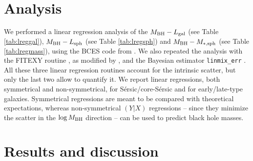 \documentclass[preprint2]{emulateapj}
\begin{document}



\section{Analysis}
\label{sec:anal}
We performed a linear regression analysis of the $M_{\rm BH} - L_{\rm gal}$ (see Table \ref{tab:lreggal}), 
$M_{\rm BH} - L_{\rm sph}$ (see Table \ref{tab:lregsph}) and $M_{\rm BH} - M_{\rm *,sph}$ (see Table \ref{tab:lregmass}),
using the BCES code from \cite{akritasbershady1996}. 
We also repeated the analysis with the FITEXY routine \citep{press1992}, as modified by \cite{tremaine2002}, 
and the Bayesian estimator {\tt linmix\_err} \citep{linmixerr}. 
All these three linear regression routines account for the intrinsic scatter, 
but only the last two allow to quantify it.
We report linear regressions, both symmetrical and non-symmetrical, 
for S\'ersic/core-S\'ersic and for early/late-type galaxies.
Symmetrical regressions are meant to be compared with theoretical expectations, 
whereas non-symmetrical $(Y|X)$ regressions -- 
since they minimize the scatter in the $\log M_{\rm BH}$ direction -- 
can be used to predict black hole masses.

\section{Results and discussion}
\label{sec:res}
\end{document}
